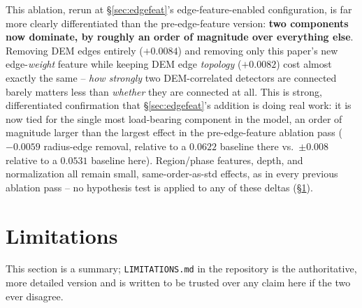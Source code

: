 \documentclass[11pt]{article}
\begin{document}
This ablation, rerun at \S\ref{sec:edgefeat}'s edge-feature-enabled
configuration, is far more clearly differentiated than the pre-edge-feature
version: \textbf{two components now dominate, by roughly an order of
magnitude over everything else}. Removing DEM edges entirely
($+0.0084$) and removing only this paper's new edge-\emph{weight} feature
while keeping DEM edge \emph{topology} ($+0.0082$) cost almost exactly the
same -- \emph{how strongly} two DEM-correlated detectors are connected
barely matters less than \emph{whether} they are connected at all. This is
strong, differentiated confirmation that \S\ref{sec:edgefeat}'s addition is
doing real work: it is now tied for the single most load-bearing component
in the model, an order of magnitude larger than the largest effect in the
pre-edge-feature ablation pass ($-0.0059$ radius-edge removal, relative to
a $0.0622$ baseline there vs.\ $\pm 0.008$ relative to a $0.0531$ baseline
here). Region/phase features, depth, and normalization all remain small,
same-order-as-std effects, as in every previous ablation pass -- no
hypothesis test is applied to any of these deltas (\S\ref{sec:limitations}).

\section{Limitations}
\label{sec:limitations}

This section is a summary; \texttt{LIMITATIONS.md} in the repository is the
authoritative, more detailed version and is written to be trusted over any
claim here if the two ever disagree.
\end{document}
